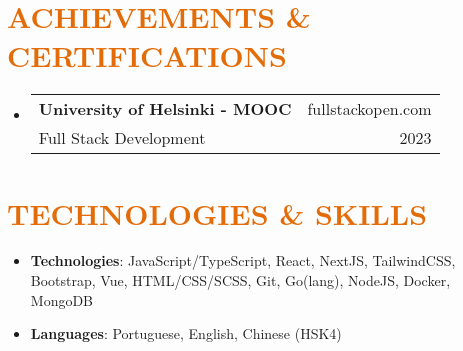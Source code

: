 \documentclass[a4paper, 20pt]{article}
\makeatletter
\newcommand{\resumeItem}[2]{
  \item\small{
    \textbf{#1}{: #2 \vspace{-2pt}}
  }
}
\newcommand{\resumeSubheading}[4]{
  \vspace{-1pt}\item
    \begin{tabular*}{0.97\textwidth}{l@{\extracolsep{\fill}}r}
      \textbf{#1} & #2 \\
      #3 & #4 \\
    \end{tabular*}\vspace{-5pt}
}
\newcommand{\resumeSubItem}[2]{\resumeItem{#1}{#2}\vspace{-3pt}}
\newcommand{\resumeSubHeadingListStart}{\begin{itemize}[leftmargin=*]}
\newcommand{\resumeSubHeadingListEnd}{\end{itemize}}
\makeatother
\begin{document}
\begin{CJK*}{UTF8}{gbsn}
\vspace{5pt}
\section{\textcolor[HTML]{E36C09}{\textbf{ACHIEVEMENTS \& CERTIFICATIONS}}}
\resumeSubHeadingListStart{}
\resumeSubheading{University of Helsinki - MOOC}{fullstackopen.com}
{Full Stack Development}{2023}
\resumeSubHeadingListEnd{}

\vspace{5pt}
\section{\textcolor[HTML]{E36C09}{\textbf{TECHNOLOGIES \& SKILLS}}}
\resumeSubHeadingListStart{}
	  \resumeSubItem{Technologies}{\quad JavaScript/TypeScript, React, NextJS, TailwindCSS, Bootstrap, Vue, HTML/CSS/SCSS, Git, Go(lang), NodeJS, Docker, MongoDB}
	  \resumeSubItem{Languages}{\quad Portuguese, English, Chinese (HSK4)}
    \resumeSubHeadingListEnd{}


\vspace{5pt}

\end{CJK*}
\end{document}
